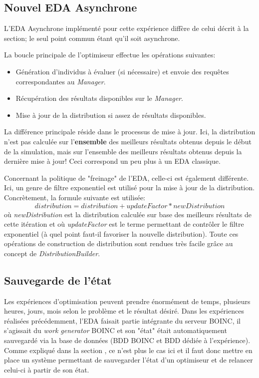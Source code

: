 \documentclass[a4paper, 11pt]{report}
\begin{document}


\subsection{Nouvel EDA Asynchrone}
L'EDA Asynchrone implémenté pour cette expérience diffère de celui décrit à la section; le seul point commun étant qu'il soit asynchrone. %

La boucle principale de l'optimiseur effectue les opérations suivantes:
\begin{itemize}
\item Génération d'individus à évaluer (si nécessaire) et envoie des requêtes correspondantes au \textit{Manager}.
\item Récupération des résultats disponibles sur le \textit{Manager}.
\item Mise à jour de la distribution si assez de résultats disponibles.
\end{itemize}

La différence principale réside dans le processus de mise à jour. Ici, la distribution n'est pas calculée sur l'\textbf{ensemble} des meilleurs résultats obtenus depuis le début de la simulation, mais sur l'ensemble des meilleurs résultats obtenus depuis la dernière mise à jour! Ceci correspond un peu plus à un EDA classique.

Concernant la politique de "freinage" de l'EDA, celle-ci est également différente. Ici, un genre de filtre exponentiel %
est utilisé pour la mise à jour de la distribution. Concrètement, la formule suivante est utilisée:
$$distribution = distribution + updateFactor * newDistribution$$
où \textit{newDistribution} est la distribution calculée sur base des meilleurs résultats de cette itération et où \textit{updateFactor} est le terme permettant de contrôler le filtre exponentiel (à quel point faut-il favoriser la nouvelle distribution). Toute ces opérations de construction de distribution sont rendues très facile grâce au concept de \textit{DistributionBuilder}.

\subsection{Sauvegarde de l'état}
Les expériences d'optimisation peuvent prendre énormément de temps, plusieurs heures, jours, mois selon le problème et le résultat désiré. Dans les expériences réalisées précédemment, l'EDA faisait partie intégrante du serveur \textsc{BOINC}, il s'agissait du \textit{work generator} \textsc{BOINC} et son "état" était automatiquement sauvegardé via la base de données (BDD \textsc{BOINC} et BDD dédiée à l'expérience). Comme expliqué dans la section %
, ce n'est plus le cas ici et il faut donc mettre en place un système permettant de sauvegarder l'état d'un optimiseur et de relancer celui-ci à partir de son état.
\end{document}
